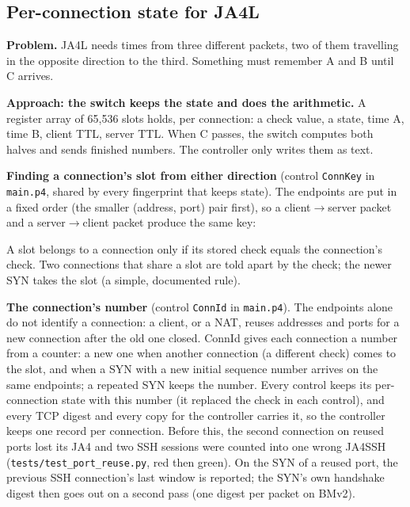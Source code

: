 \documentclass[11pt,a4paper]{article}
\newcommand{\code}[1]{\texttt{#1}}
\begin{document}
\subsection{Per-connection state for JA4L}

\textbf{Problem.} JA4L needs times from three different packets, two of them travelling in the opposite direction
to the third. Something must remember A and B until C arrives.

\textbf{Approach: the switch keeps the state and does the arithmetic.} A register array of 65,536 slots holds, per
connection: a check value, a state, time A, time B, client TTL, server TTL. When C passes, the switch computes both
halves and sends finished numbers. The controller only writes them as text.

\textbf{Finding a connection's slot from either direction} (control \code{ConnKey} in \code{main.p4}, shared by
every fingerprint that keeps state). The endpoints are put in a fixed order (the smaller
(address, port) pair first), so a client$\to$server packet and a server$\to$client packet produce the same key:
\begin{center}
\end{center}
A slot belongs to a connection only if its stored check equals the connection's check. Two connections that share a
slot are told apart by the check; the newer SYN takes the slot (a simple, documented rule).

\textbf{The connection's number} (control \code{ConnId} in \code{main.p4}). The endpoints alone do not identify a
connection: a client, or a NAT, reuses addresses and ports for a new connection after the old one closed. ConnId
gives each connection a number from a counter: a new one when another connection (a different check) comes to the
slot, and when a SYN with a new initial sequence number arrives on the same endpoints; a repeated SYN keeps the
number. Every control keeps its per-connection state with this number (it replaced the check in each control), and
every TCP digest and every copy for the controller carries it, so the controller keeps one record per connection.
Before this, the second connection on reused ports lost its JA4 and two SSH sessions were counted into one wrong
JA4SSH (\code{tests/test\_port\_reuse.py}, red then green). On the SYN of a reused port, the previous SSH
connection's last window is reported; the SYN's own handshake digest then goes out on a second pass (one digest per
packet on BMv2).
\end{document}
